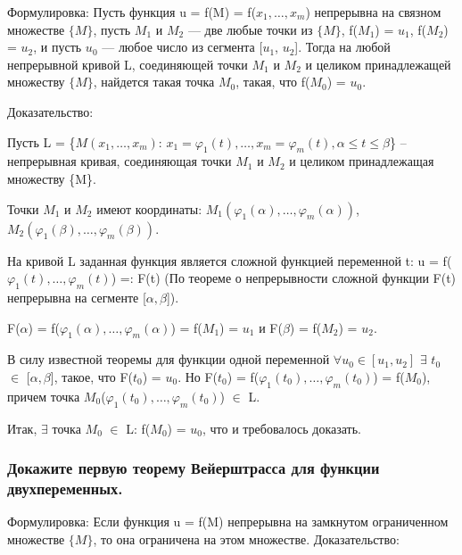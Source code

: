 \documentclass[a4paper, 12pt]{article}
\renewcommand{\phi}{\varphi}
\def\newline{}%
\begin{document}
            Формулировка:
            Пусть функция u = f(M) = f($x_1, \ldots, x_m$) непрерывна на связном\newline
            множестве $\{M\}$, пусть $M_1$ и $M_2$ — две любые точки из $\{M\}$,
            f($M_1$) = $u_1$, f($M_2$) = $u_2$, и пусть $u_0$ — любое число из
            сегмента [$u_1$, $u_2$].
            Тогда на любой непрерывной кривой L, соединяющей точки
            $M_1$ и $M_2$ и целиком принадлежащей множеству $\{M\}$, найдется
            такая точка $M_0$, такая, что f($M_0$) = $u_0$.

            Доказательство:

            Пусть L = \{$M(x_1, \ldots, x_m)$: $x_1 = {\phi}_1(t), \ldots, x_m = {\phi}_m(t),
            \alpha \leq t \leq \beta$\} -- непрерывная кривая, соединяющая
            точки $M_1$ и $M_2$ и целиком принадлежащая множеству \{M\}.

            Точки $M_1$ и $M_2$ имеют координаты: $M_1({\phi}_1(\alpha), 
            \ldots, {\phi}_m(\alpha))$, $M_2({\phi}_1(\beta), \ldots,
            {\phi}_m(\beta))$.

            На кривой L заданная функция является сложной функцией переменной t:\newline
            u = f(${\phi}_1(t), \ldots, {\phi}_m(t)$) =: F(t) (По теореме о непрерывности
            сложной функции F(t) непрерывна на сегменте [$\alpha, \beta$]).

            F($\alpha$) = f(${\phi}_1(\alpha), \ldots, {\phi}_m(\alpha)$) = f($M_1$)
            = $u_1$ и F($\beta$) = f($M_2$) = $u_2$.

            В силу известной теоремы для функции одной переменной $\forall u_0 \in [u_1, u_2]$\newline
            $\exists$ $t_0$ $\in$ [$\alpha, \beta$], такое, что F($t_0$) = $u_0$.
            Но F($t_0$) = f(${\phi}_1(t_0), \ldots, {\phi}_m(t_0)$) = f($M_0$),
            причем точка $M_0$(${\phi}_1(t_0), \ldots, {\phi}_m(t_0)$) $\in$ L.

            Итак, $\exists$ точка $M_0$ $\in$ L: f($M_0$) = $u_0$, что и требовалось
            доказать.

            \subsubsection{Докажите первую теорему Вейерштрасса для функции двух\newline переменных.}

            Формулировка: Если функция u = f(M) непрерывна на замкнутом ограниченном
            множестве $\{M\}$, то она ограничена на этом множестве.\newline
            Доказательство:
\end{document}
